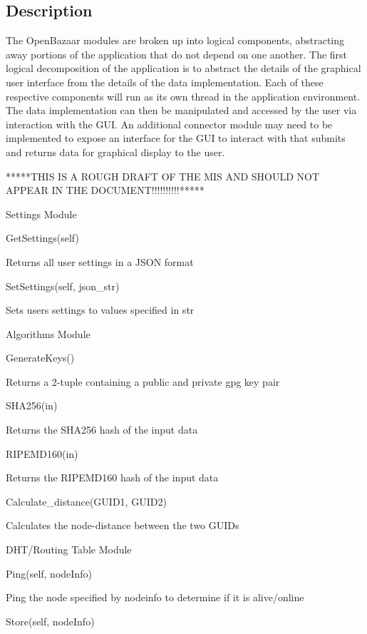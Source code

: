 \documentclass{article}
\begin{document}
\subsection*{Description}
The OpenBazaar modules are broken up into logical components, abstracting away portions of the application that do not depend on one another. The first logical decomposition of the application is to abstract the details of the graphical user interface from the details of the data implementation. Each of these respective components will run as its own thread in the application environment. The data implementation can then be manipulated and accessed by the user via interaction with the GUI. An additional connector module may need to be implemented to expose an interface for the GUI to interact with that submits and returns data for graphical display to the user.

\iffalse

*****THIS IS A ROUGH DRAFT OF THE MIS AND SHOULD NOT APPEAR IN THE DOCUMENT!!!!!!!!!!*****

Settings Module 

    GetSettings(self) 

        Returns all user settings in a JSON format 

    SetSettings(self, json_str) 

        Sets users settings to values specified in str 

     

     

Algorithms Module 

    GenerateKeys() 

        Returns a 2-tuple containing a public and private gpg key pair 

    SHA256(in) 

        Returns the SHA256 hash of the input data 

    RIPEMD160(in) 

        Returns the RIPEMD160 hash of the input data 

    Calculate_distance(GUID1, GUID2) 

        Calculates the node-distance between the two GUIDs 

 
DHT/Routing Table Module 

    Ping(self, nodeInfo) 

        Ping the node specified by nodeinfo to determine if it is alive/online 

    Store(self, nodeInfo) 
\end{document}
